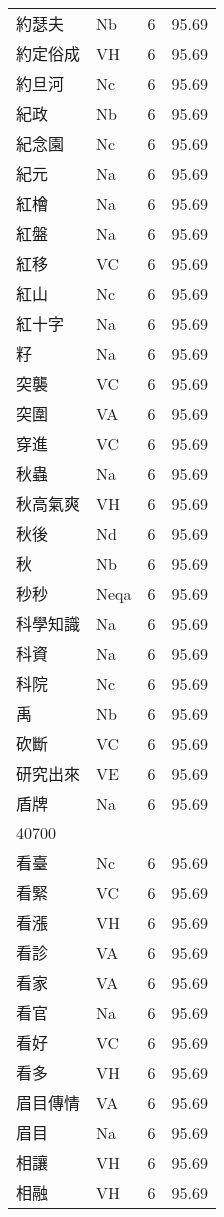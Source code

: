 \documentclass[twocolumn]{book}
\begin{document}
\begin{supertabular}{llrr}
約瑟夫 & Nb & 6 &  95.69\\
約定俗成 & VH & 6 &  95.69\\
約旦河 & Nc & 6 &  95.69\\
紀政 & Nb & 6 &  95.69\\
紀念園 & Nc & 6 &  95.69\\
紀元 & Na & 6 &  95.69\\
紅檜 & Na & 6 &  95.69\\
紅盤 & Na & 6 &  95.69\\
紅移 & VC & 6 &  95.69\\
紅山 & Nc & 6 &  95.69\\
紅十字 & Na & 6 &  95.69\\
籽 & Na & 6 &  95.69\\
突襲 & VC & 6 &  95.69\\
突圍 & VA & 6 &  95.69\\
穿進 & VC & 6 &  95.69\\
秋蟲 & Na & 6 &  95.69\\
秋高氣爽 & VH & 6 &  95.69\\
秋後 & Nd & 6 &  95.69\\
秋 & Nb & 6 &  95.69\\
秒秒 & Neqa & 6 &  95.69\\
科學知識 & Na & 6 &  95.69\\
科資 & Na & 6 &  95.69\\
科院 & Nc & 6 &  95.69\\
禹 & Nb & 6 &  95.69\\
砍斷 & VC & 6 &  95.69\\
研究出來 & VE & 6 &  95.69\\
盾牌 & Na & 6 &  95.69\\
40700\\
看臺 & Nc & 6 &  95.69\\
看緊 & VC & 6 &  95.69\\
看漲 & VH & 6 &  95.69\\
看診 & VA & 6 &  95.69\\
看家 & VA & 6 &  95.69\\
看官 & Na & 6 &  95.69\\
看好 & VC & 6 &  95.69\\
看多 & VH & 6 &  95.69\\
眉目傳情 & VA & 6 &  95.69\\
眉目 & Na & 6 &  95.69\\
相讓 & VH & 6 &  95.69\\
相融 & VH & 6 &  95.69\\

\end{supertabular}
\end{document}
